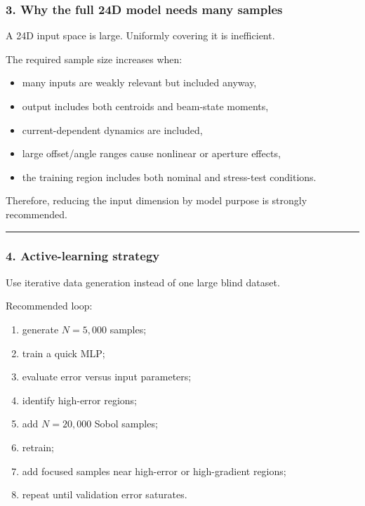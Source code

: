 \documentclass[
]{article}
\providecommand{\tightlist}{%
  \setlength{\itemsep}{0pt}\setlength{\parskip}{0pt}}
\begin{document}
\hypertarget{why-the-full-24d-model-needs-many-samples}{%
\subsubsection{3. Why the full 24D model needs many
samples}\label{why-the-full-24d-model-needs-many-samples}}

A 24D input space is large. Uniformly covering it is inefficient.

The required sample size increases when:

\begin{itemize}
\tightlist
\item
  many inputs are weakly relevant but included anyway,
\item
  output includes both centroids and beam-state moments,
\item
  current-dependent dynamics are included,
\item
  large offset/angle ranges cause nonlinear or aperture effects,
\item
  the training region includes both nominal and stress-test conditions.
\end{itemize}

Therefore, reducing the input dimension by model purpose is strongly
recommended.

\begin{center}\rule{0.5\linewidth}{0.5pt}\end{center}

\hypertarget{active-learning-strategy}{%
\subsubsection{4. Active-learning
strategy}\label{active-learning-strategy}}

Use iterative data generation instead of one large blind dataset.

Recommended loop:

\begin{enumerate}
\def\labelenumi{\arabic{enumi}.}
\tightlist
\item
  generate \(N=5{,}000\) samples;
\item
  train a quick MLP;
\item
  evaluate error versus input parameters;
\item
  identify high-error regions;
\item
  add \(N=20{,}000\) Sobol samples;
\item
  retrain;
\item
  add focused samples near high-error or high-gradient regions;
\item
  repeat until validation error saturates.
\end{enumerate}
\end{document}
